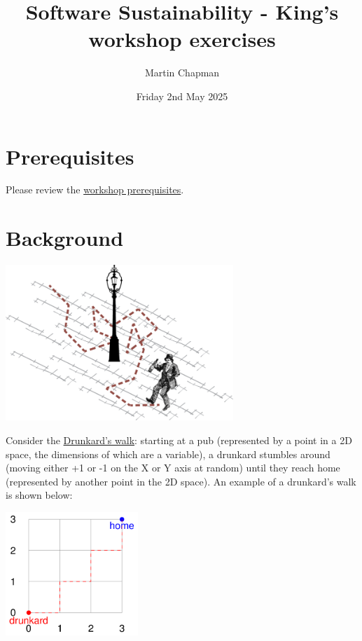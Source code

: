 \documentclass{article}
\title{Software Sustainability - King's workshop exercises}
\author{Martin Chapman}
\date{Friday 2nd May 2025}
\begin{document}

\maketitle

\section{Prerequisites}

Please review the \href{https://github.com/martinteaching/sustainability/blob/master/workshops/kcl/2025/README.md}{workshop prerequisites}.

\section{Background}

\begin{center}
    \includegraphics[width=8.6cm]{images/drunkard.png}
\end{center}

Consider the \href{https://en.wikipedia.org/wiki/Random_walk}{Drunkard's walk}: starting at a pub (represented by a point in a 2D space, the dimensions of which are a variable), a drunkard stumbles around (moving either +1 or -1 on the X or Y axis at random) until they reach home (represented by another point in the 2D space).
An example of a drunkard's walk is shown below:

\begin{center}
    \includegraphics[width=5cm]{images/movement.png}
\end{center}
\end{document}
